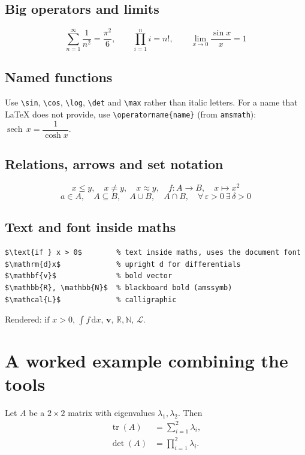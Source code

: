 \documentclass[11pt,a4paper]{article}
\begin{document}
\subsection{Big operators and limits}

\[
  \sum_{n=1}^{\infty} \frac{1}{n^2} = \frac{\pi^2}{6}, \qquad
  \prod_{i=1}^{n} i = n!, \qquad
  \lim_{x \to 0} \frac{\sin x}{x} = 1
\]

\subsection{Named functions}

Use \verb|\sin|, \verb|\cos|, \verb|\log|, \verb|\det| and \verb|\max|
rather than italic letters. For a name that LaTeX does not provide,
use \verb|\operatorname{name}| (from \texttt{amsmath}):
$\operatorname{sech}\,x = \dfrac{1}{\cosh x}$.

\subsection{Relations, arrows and set notation}

\[
  x \le y, \quad x \ne y, \quad x \approx y, \quad
  f\colon A \to B, \quad x \mapsto x^2
\]
\[
  a \in A, \quad A \subseteq B, \quad A \cup B, \quad A \cap B, \quad
  \forall\, \varepsilon > 0\ \exists\, \delta > 0
\]

\subsection{Text and font inside maths}

\begin{verbatim}
$\text{if } x > 0$        % text inside maths, uses the document font
$\mathrm{d}x$             % upright d for differentials
$\mathbf{v}$              % bold vector
$\mathbb{R}, \mathbb{N}$  % blackboard bold (amssymb)
$\mathcal{L}$             % calligraphic
\end{verbatim}

Rendered: $\text{if } x > 0$, $\int f\,\mathrm{d}x$, $\mathbf{v}$,
$\mathbb{R}, \mathbb{N}$, $\mathcal{L}$.

\section{A worked example combining the tools}

Let $A$ be a $2 \times 2$ matrix with eigenvalues $\lambda_1, \lambda_2$.
Then
\begin{align*}
  \operatorname{tr}(A) &= \sum_{i=1}^{2} \lambda_i, \\
  \det(A)              &= \prod_{i=1}^{2} \lambda_i .
\end{align*}
\end{document}
